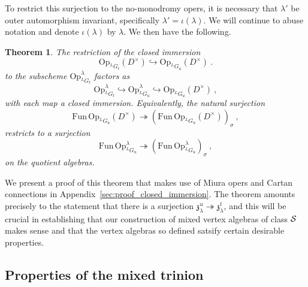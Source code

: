 \documentclass[a4paper]{article}
\newtheorem{thm}{Theorem}[section]
\def\SS{{\cal S}}
\def \zf{\mathfrak{z}}
\begin{document}
To restrict this surjection to the no-monodromy opers, it is necessary that $\lambda'$ be outer automorphism invariant, specifically $\lambda'=\iota(\lambda)$. We will continue to abuse notation and denote $\iota(\lambda)$ by $\lambda$. We then have the following.
\begin{thm}\label{thm:closed_immersion}
The restriction of the closed immersion
\begin{equation*}
	\mathrm{Op}_{ ^L G_t}(D^\times) \hookrightarrow\mathrm{Op}_{ ^L G_u}(D^\times)~.
\end{equation*}
to the subscheme $\mathrm{Op}_{^L G_t}^{\lambda}$ factors as
\begin{equation*}
	\mathrm{Op}_{^L G_t}^{\lambda}\hookrightarrow\mathrm{Op}_{^L G_u}^{\lambda}\hookrightarrow\mathrm{Op}_{ ^L G_u}(D^\times)~,
\end{equation*}
with each map a closed immersion. Equivalently, the natural surjection
\begin{equation*}
	\mathrm{Fun\, Op}_{^LG_u}(D^\times)\twoheadrightarrow (\mathrm{Fun\, Op}_{^LG_u}(D^\times))_\sigma~,
\end{equation*}
restricts to a surjection
\begin{equation*}
	\mathrm{Fun\, Op}^\lambda_{^LG_u}\twoheadrightarrow (\mathrm{Fun\, Op}^\lambda_{^LG_u})_\sigma~,
\end{equation*}
on the quotient algebras.
\end{thm}
We present a proof of this theorem that makes use of Miura opers and Cartan connections in Appendix~\ref{sec:proof_closed_immersion}. The theorem amounts precisely to the statement that there is a surjection $\zf^u_{\lambda}\twoheadrightarrow \zf^t_{\lambda}$, and this will be crucial in establishing that our construction of mixed vertex algebras of class $\SS$ makes sense and that the vertex algebras so defined satsify certain desirable properties.

\subsection{\label{subsec:mixed_trinion_properties}Properties of the mixed trinion}
\end{document}
